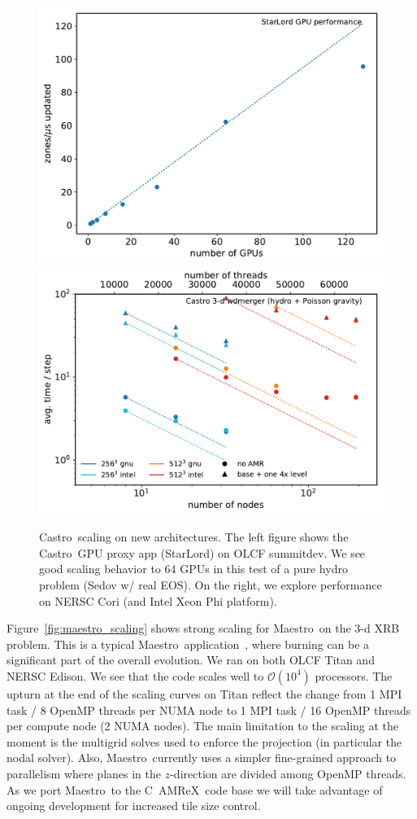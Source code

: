 \documentclass[a4paper]{jpconf}
\newcommand{\maestro}{{\sffamily Maestro}}
\newcommand{\castro}{{\sffamily Castro}}
\newcommand{\starlord}{{\sffamily StarLord}}
\newcommand{\amrex}{{\sffamily AMReX}}
\newcommand{\cpp}{C\nolinebreak\hspace{-.05em}\raisebox{.4ex}{\tiny\bf +}\nolinebreak\hspace{-.10em}\raisebox{.4ex}{\tiny\bf +}}
\begin{document}
\begin{figure}[t]
\centering
\includegraphics[width=0.48\linewidth]{summitdev_scaling}
\includegraphics[width=0.48\linewidth]{cori_scaling}
\caption{\label{fig:knl-gpu-scaling} \castro\ scaling on new
  architectures.  The left figure shows the \castro\ GPU proxy app
  (\starlord) on OLCF summitdev.  We see good scaling behavior to 64
  GPUs in this test of a pure hydro problem (Sedov w/ real EOS).  On the
right, we explore performance on NERSC Cori (and Intel Xeon Phi platform).}
\end{figure}

Figure~\ref{fig:maestro_scaling} shows strong scaling for \maestro\ on
the 3-d XRB problem.  This is a typical
\maestro\ application~\cite{xrb3}, where burning can be a significant
part of the overall evolution.  We ran on both OLCF Titan and NERSC
Edison.  We see that the code scales well to $\mathcal{O}(10^4)$
processors.  The upturn at the end of the scaling curves on Titan
reflect the change from 1 MPI task / 8 OpenMP threads per NUMA node to
1 MPI task / 16 OpenMP threads per compute node (2 NUMA nodes).  The
main limitation to the scaling at the moment is the multigrid solves
used to enforce the projection (in particular the nodal solver).
Also, \maestro\ currently uses a simpler fine-grained approach to parallelism
where planes in the $z$-direction are divided among OpenMP threads.
As we port \maestro\ to the \cpp\ \amrex\ code base we will take
advantage of ongoing development for increased tile size control.
\end{document}
